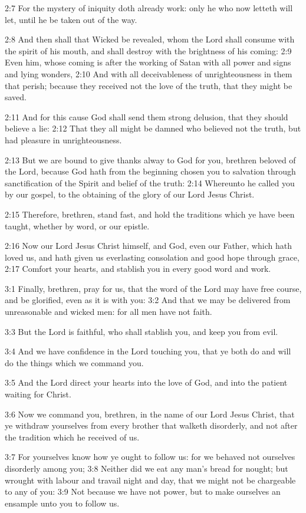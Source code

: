 2:7 For the mystery of iniquity doth already work: only he who now
letteth will let, until he be taken out of the way.

2:8 And then shall that Wicked be revealed, whom the Lord shall
consume with the spirit of his mouth, and shall destroy with the
brightness of his coming: 2:9 Even him, whose coming is after the
working of Satan with all power and signs and lying wonders, 2:10 And
with all deceivableness of unrighteousness in them that perish;
because they received not the love of the truth, that they might be
saved.

2:11 And for this cause God shall send them strong delusion, that they
should believe a lie: 2:12 That they all might be damned who believed
not the truth, but had pleasure in unrighteousness.

2:13 But we are bound to give thanks alway to God for you, brethren
beloved of the Lord, because God hath from the beginning chosen you to
salvation through sanctification of the Spirit and belief of the
truth: 2:14 Whereunto he called you by our gospel, to the obtaining of
the glory of our Lord Jesus Christ.

2:15 Therefore, brethren, stand fast, and hold the traditions which ye
have been taught, whether by word, or our epistle.

2:16 Now our Lord Jesus Christ himself, and God, even our Father,
which hath loved us, and hath given us everlasting consolation and
good hope through grace, 2:17 Comfort your hearts, and stablish you in
every good word and work.

3:1 Finally, brethren, pray for us, that the word of the Lord may have
free course, and be glorified, even as it is with you: 3:2 And that we
may be delivered from unreasonable and wicked men: for all men have
not faith.

3:3 But the Lord is faithful, who shall stablish you, and keep you
from evil.

3:4 And we have confidence in the Lord touching you, that ye both do
and will do the things which we command you.

3:5 And the Lord direct your hearts into the love of God, and into the
patient waiting for Christ.

3:6 Now we command you, brethren, in the name of our Lord Jesus
Christ, that ye withdraw yourselves from every brother that walketh
disorderly, and not after the tradition which he received of us.

3:7 For yourselves know how ye ought to follow us: for we behaved not
ourselves disorderly among you; 3:8 Neither did we eat any man's bread
for nought; but wrought with labour and travail night and day, that we
might not be chargeable to any of you: 3:9 Not because we have not
power, but to make ourselves an ensample unto you to follow us.

